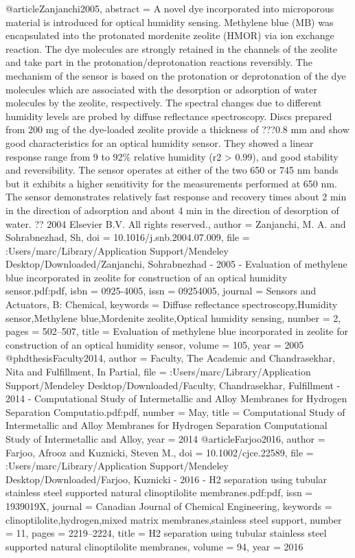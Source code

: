 @article{Zanjanchi2005,
abstract = {A novel dye incorporated into microporous material is introduced for optical humidity sensing. Methylene blue (MB) was encapsulated into the protonated mordenite zeolite (HMOR) via ion exchange reaction. The dye molecules are strongly retained in the channels of the zeolite and take part in the protonation/deprotonation reactions reversibly. The mechanism of the sensor is based on the protonation or deprotonation of the dye molecules which are associated with the desorption or adsorption of water molecules by the zeolite, respectively. The spectral changes due to different humidity levels are probed by diffuse reflectance spectroscopy. Discs prepared from 200 mg of the dye-loaded zeolite provide a thickness of ???0.8 mm and show good characteristics for an optical humidity sensor. They showed a linear response range from 9 to 92{\%} relative humidity (r2 {\textgreater} 0.99), and good stability and reversibility. The sensor operates at either of the two 650 or 745 nm bands but it exhibits a higher sensitivity for the measurements performed at 650 nm. The sensor demonstrates relatively fast response and recovery times about 2 min in the direction of adsorption and about 4 min in the direction of desorption of water. ?? 2004 Elsevier B.V. All rights reserved.},
author = {Zanjanchi, M. A. and Sohrabnezhad, Sh},
doi = {10.1016/j.snb.2004.07.009},
file = {:Users/marc/Library/Application Support/Mendeley Desktop/Downloaded/Zanjanchi, Sohrabnezhad - 2005 - Evaluation of methylene blue incorporated in zeolite for construction of an optical humidity sensor.pdf:pdf},
isbn = {0925-4005},
issn = {09254005},
journal = {Sensors and Actuators, B: Chemical},
keywords = {Diffuse reflectance spectroscopy,Humidity sensor,Methylene blue,Mordenite zeolite,Optical humidity sensing},
number = {2},
pages = {502--507},
title = {{Evaluation of methylene blue incorporated in zeolite for construction of an optical humidity sensor}},
volume = {105},
year = {2005}
}
@phdthesis{Faculty2014,
author = {Faculty, The Academic and Chandrasekhar, Nita and Fulfillment, In Partial},
file = {:Users/marc/Library/Application Support/Mendeley Desktop/Downloaded/Faculty, Chandrasekhar, Fulfillment - 2014 - Computational Study of Intermetallic and Alloy Membranes for Hydrogen Separation Computatio.pdf:pdf},
number = {May},
title = {{Computational Study of Intermetallic and Alloy Membranes for Hydrogen Separation Computational Study of Intermetallic and Alloy}},
year = {2014}
}
@article{Farjoo2016,
author = {Farjoo, Afrooz and Kuznicki, Steven M.},
doi = {10.1002/cjce.22589},
file = {:Users/marc/Library/Application Support/Mendeley Desktop/Downloaded/Farjoo, Kuznicki - 2016 - H2 separation using tubular stainless steel supported natural clinoptilolite membranes.pdf:pdf},
issn = {1939019X},
journal = {Canadian Journal of Chemical Engineering},
keywords = {clinoptilolite,hydrogen,mixed matrix membranes,stainless steel support},
number = {11},
pages = {2219--2224},
title = {{H2 separation using tubular stainless steel supported natural clinoptilolite membranes}},
volume = {94},
year = {2016}
}
